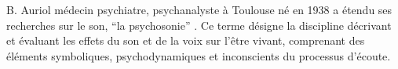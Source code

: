     B. Auriol médecin psychiatre,
   psychanalyste à Toulouse né en 1938
a étendu ses recherches sur le son, %
\enquote {la psychosonie} \autocite{auriol:cle}. Ce terme
désigne la discipline décrivant et évaluant les effets du
son et de la voix sur l'être vivant, comprenant des éléments
symboliques, psychodynamiques et inconscients du processus
d'écoute. 
